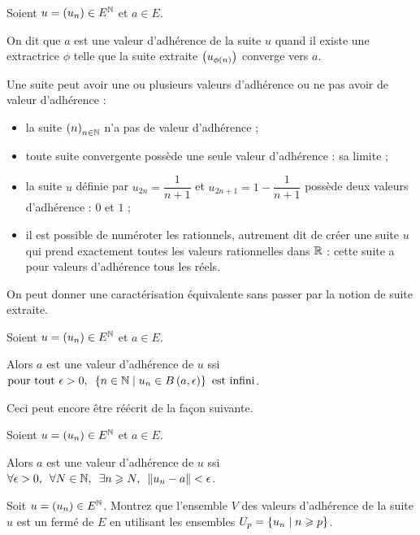 \begin{defi}
Soient \(u=\left(u_n\right)\in E^{\mathbb{N}}\) et \(a\in E\).

On dit que \(a\) est une valeur d'adhérence de la suite \(u\) quand il existe une extractrice \(\phi\) telle que la suite extraite \(\left(u_{\phi\left(n\right)}\right)\) converge vers \(a\).
\end{defi}

Une suite peut avoir une ou plusieurs valeurs d'adhérence ou ne pas avoir de valeur d'adhérence :

\begin{itemize}
    \item la suite \(\left(n\right)_{n\in\mathbb{N}}\) n'a pas de valeur d'adhérence ; \\
    \item toute suite convergente possède une seule valeur d'adhérence : sa limite ; \\
    \item la suite \(u\) définie par \(u_{2n}=\dfrac{1}{n+1}\) et \(u_{2n+1}=1-\dfrac{1}{n+1}\) possède deux valeurs d'adhérence : \(0\) et \(1\) ; \\
    \item il est possible de numéroter les rationnels, autrement dit de créer une suite \(u\) qui prend exactement toutes les valeurs rationnelles dans \(\mathbb{R}\) : cette suite a pour valeurs d'adhérence tous les réels.
\end{itemize}

On peut donner une caractérisation équivalente sans passer par la notion de suite extraite.

\begin{prop}
Soient \(u=\left(u_n\right)\in E^{\mathbb{N}}\) et \(a\in E\).

Alors \(a\) est une valeur d'adhérence de \(u\) ssi \(\quantifs{\tpt\epsilon>0}\accol{n\in\N\tq u_n\in\bouleo{a}{\epsilon}}\text{ est infini}\).
\end{prop}

Ceci peut encore être réécrit de la façon suivante.

\begin{prop}
Soient \(u=\left(u_n\right)\in E^{\mathbb{N}}\) et \(a\in E\).

Alors \(a\) est une valeur d'adhérence de \(u\) ssi \(\quantifs{\forall\epsilon>0;\forall N\in\N;\exists n\geq N}\norme{u_n-a}<\epsilon\).
\end{prop}

\begin{exo}
Soit \(u=\left(u_n\right)\in E^{\mathbb{N}}\). Montrez que l'ensemble \(V\) des valeurs d'adhérence de la suite \(u\) est un fermé de \(E\) en utilisant les ensembles \(U_p=\left\lbrace u_n\;\middle|\; n\geqslant p\right\rbrace\).
\end{exo}

